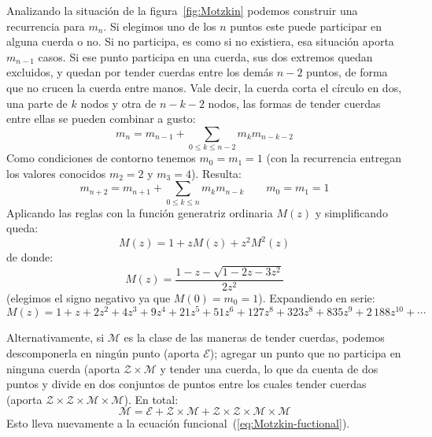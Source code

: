   Analizando la situación de la figura~\ref{fig:Motzkin}
  podemos construir una recurrencia para \(m_n\).
  Si elegimos uno de los \(n\) puntos
  este puede participar en alguna cuerda o no.
  Si no participa,
  es como si no existiera,
  esa situación aporta \(m_{n - 1}\) casos.
  Si ese punto participa en una cuerda,
  sus dos extremos quedan excluidos,
  y quedan por tender cuerdas entre los demás \(n - 2\) puntos,
  de forma que no crucen la cuerda entre manos.
  Vale decir,
  la cuerda corta el círculo en dos,
  una parte de \(k\) nodos y otra de \(n - k - 2\) nodos,
  las formas de tender cuerdas entre ellas se pueden combinar a gusto:%
  \begin{equation*}
    m_n
      = m_{n - 1} + \sum_{0 \le k \le n - 2} m_k m_{n - k - 2}
  \end{equation*}
  Como condiciones de contorno tenemos \(m_0 = m_1 = 1\)
  (con la recurrencia entregan los valores conocidos
   \(m_2 = 2\) y \(m_3 = 4\)).
  Resulta:
  \begin{equation}
    \label{eq:Motzkin-recurrence}
    m_{n + 2}
      = m_{n + 1} + \sum_{0 \le k \le n} m_k m_{n - k}
    \qquad m_0 = m_1 = 1
  \end{equation}
  Aplicando las reglas con la función generatriz ordinaria \(M(z)\)
  y simplificando queda:%
  \begin{equation}
    \label{eq:Motzkin-fuctional}
    M(z)
      = 1 + z M(z) + z^2 M^2(z)
  \end{equation}
  de donde:
  \begin{equation}
    \label{eq:Motzkin-gf}
    M(z)
      = \frac{1 - z - \sqrt{1 - 2 z - 3 z^2}}{2 z^2}
  \end{equation}
  (elegimos el signo negativo ya que \(M(0) = m_0 = 1\)).
  Expandiendo en serie:
  \begin{equation*}
    M(z)
      = 1 + z + 2 z^2 + 4 z^3 + 9 z^4 + 21 z^5 + 51 z^6 + 127 z^8
	  + 323 z^8 + 835 z^9 + 2\,188 z^{10} + \dotsb
  \end{equation*}

  Alternativamente,
  si \(\mathcal{M}\) es la clase de las maneras de tender cuerdas,%
  podemos descomponerla
  en ningún punto
  (aporta \(\mathcal{E}\));
  agregar un punto que no participa en ninguna cuerda
  (aporta \( \mathcal{Z} \times \mathcal{M}\)
  y tender una cuerda,
  lo que da cuenta de dos puntos y divide en dos conjuntos de puntos
  entre los cuales tender cuerdas
  (aporta
     \(\mathcal{Z} \times \mathcal{Z} \times \mathcal{M} \times \mathcal{M}\)).
  En total:
  \begin{equation}
    \label{eq:Motzkin-se}
    \mathcal{M}
      = \mathcal{E}
	  + \mathcal{Z} \times \mathcal{M}
	  + \mathcal{Z} \times \mathcal{Z}
	      \times \mathcal{M} \times \mathcal{M}
  \end{equation}
  Esto lleva nuevamente a la ecuación funcional~(\ref{eq:Motzkin-fuctional}).

